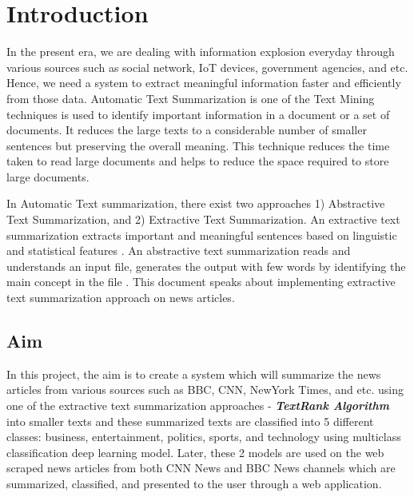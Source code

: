 \documentclass[a4paper,4pt]{article}
\begin{document}
\section{Introduction}
In the present era, we are dealing with information explosion everyday through various sources such as social network, IoT devices, government agencies, and etc. Hence,
we need a system to extract meaningful information faster and efficiently from those data. Automatic Text Summarization is one of 
the Text Mining techniques is used to identify important information in a document or a set of documents. It reduces the large texts to 
a considerable number of smaller sentences but preserving the overall meaning. This technique reduces the time taken to read large 
documents and helps to reduce the space required to store large documents. \par
\vspace{0.5cm}
In Automatic Text summarization, there exist two approaches 1) Abstractive Text Summarization, and 2) Extractive Text Summarization.
An extractive text summarization extracts important and meaningful sentences based on linguistic and statistical features \cite{gupta2010survey}. An
abstractive text summarization reads and understands an input file, generates the output with few words by identifying the main 
concept in the file \cite{madhuri2019extractive}. This document speaks about implementing extractive text summarization approach 
on news articles.

\subsection{Aim}
In this project, the aim is to create a system which will summarize the news articles from various sources such as BBC, CNN, NewYork
Times, and etc. using one of the extractive text summarization approaches - \textit{\textbf{TextRank Algorithm}} into smaller texts
and these summarized texts are classified into 5 different classes: business, entertainment, politics, sports, and technology 
using multiclass classification deep learning model. Later, these 2 models are used on the web scraped news articles from both CNN News and 
BBC News channels which are summarized, classified, and presented to the user through a web application.
\end{document}
